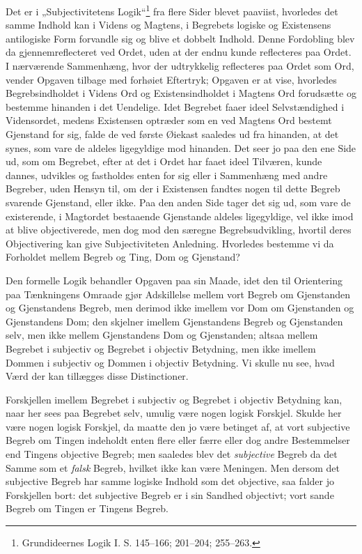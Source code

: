 \documentclass[12pt]{book}
\newcommand{\opage}[1]{\marginnote{\footnotesize\textit{[#1]}}}
\begin{document}
Det er i „Subjectivitetens Logik“\footnote{Grundideernes Logik I. S. 145--166; 201--204; 255--263.} %
fra flere Sider
blevet paaviist, hvorledes det samme Indhold kan i Videns og
Magtens, i Begrebets logiske og Existensens antilogiske Form
forvandle sig og blive et dobbelt Indhold. Denne Fordobling
blev da gjennemreflecteret ved Ordet, uden at der endnu kunde
reflecteres paa Ordet. I nærværende Sammenhæng, hvor
der udtrykkelig reflecteres paa Ordet som Ord, vender Opgaven
tilbage med forhøiet Eftertryk; Opgaven er at vise,
hvorledes Begrebsindholdet i Videns Ord og Existensindholdet
i Magtens Ord forudsætte og bestemme hinanden i det Uendelige.
Idet Begrebet faaer ideel Selvstændighed i Vidensordet,
medens Existensen optræder som en ved Magtens Ord bestemt
Gjenstand for sig, falde de ved første Øiekast saaledes ud fra
\opage{96}hinanden, at det synes, som vare de aldeles ligegyldige mod
hinanden. Det seer jo paa den ene Side ud, som om Begrebet,
efter at det i Ordet har faaet ideel Tilværen, kunde
dannes, udvikles og fastholdes enten for sig eller i Sammenhæng
med andre Begreber, uden Hensyn til, om der i Existensen
fandtes nogen til dette Begreb svarende Gjenstand, eller
ikke. Paa den anden Side tager det sig ud, som vare de
existerende, i Magtordet bestaaende Gjenstande aldeles ligegyldige,
vel ikke imod at blive objectiverede, men dog mod
den særegne Begrebsudvikling, hvortil deres Objectivering kan
give Subjectiviteten Anledning. Hvorledes bestemme vi da
Forholdet mellem Begreb og Ting, Dom og Gjenstand?

Den formelle Logik behandler Opgaven paa sin Maade,
idet den til Orientering paa Tænkningens Omraade gjør Adskillelse
mellem vort Begreb om Gjenstanden og Gjenstandens
Begreb, men derimod ikke imellem vor Dom om Gjenstanden
og Gjenstandens Dom; den skjelner imellem Gjenstandens
Begreb og Gjenstanden selv, men ikke mellem Gjenstandens
Dom og Gjenstanden; altsaa mellem Begrebet i subjectiv og
Begrebet i objectiv Betydning, men ikke imellem Dommen i
subjectiv og Dommen i objectiv Betydning. Vi skulle nu see,
hvad Værd der kan tillægges disse Distinctioner.

Forskjellen imellem Begrebet i subjectiv og Begrebet i
objectiv Betydning kan, naar her sees paa Begrebet selv,
umulig være nogen logisk Forskjel. Skulde her være nogen
logisk Forskjel, da maatte den jo være betinget af, at vort
subjective Begreb om Tingen indeholdt enten flere eller færre
eller dog andre Bestemmelser end Tingens objective Begreb;
men saaledes blev det \emph{subjective} Begreb da det Samme
som et \emph{falsk} Begreb, hvilket ikke kan være Meningen. Men
dersom det subjective Begreb har samme logiske Indhold som
det objective, saa falder jo Forskjellen bort: det subjective Begreb
er i sin Sandhed objectivt; vort sande Begreb om Tingen
er Tingens Begreb.
\end{document}
